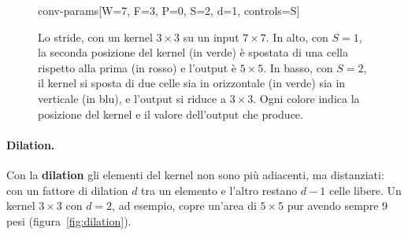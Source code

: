 \begin{figure}[htbp]
\centering
\begin{widget}{conv-params}[W=7, F=3, P=0, S=2, d=1, controls={S}]
\end{widget}
\caption{Lo stride, con un kernel $3 \times 3$ su un input $7 \times 7$. In alto, con $S = 1$, la seconda posizione del kernel (in verde) è spostata di una cella rispetto alla prima (in rosso) e l'output è $5 \times 5$. In basso, con $S = 2$, il kernel si sposta di due celle sia in orizzontale (in verde) sia in verticale (in blu), e l'output si riduce a $3 \times 3$. Ogni colore indica la posizione del kernel e il valore dell'output che produce.}
\label{fig:stride}
\end{figure}

\paragraph{Dilation.}
Con la \textbf{dilation} gli elementi del kernel non sono più adiacenti, ma distanziati: con un fattore di dilation $d$ tra un elemento e l'altro restano $d - 1$ celle libere. Un kernel $3 \times 3$ con $d = 2$, ad esempio, copre un'area di $5 \times 5$ pur avendo sempre 9 pesi (figura~\ref{fig:dilation}).

